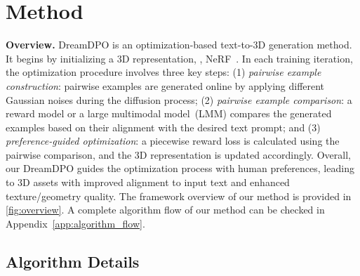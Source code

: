 \section{Method}
\label{sec:method}

\textbf{Overview.} DreamDPO is an optimization-based text-to-3D generation method. It begins by initializing a 3D representation, \eg, NeRF~\citep{mildenhall2020nerf}. In each training iteration, the optimization procedure involves three key steps: (1) \textit{pairwise example construction}: pairwise examples are generated online by applying different Gaussian noises during the diffusion process; (2) \textit{pairwise example comparison}: a reward model or a large multimodal model~(LMM) compares the generated examples based on their alignment with the desired text prompt; and (3) \textit{preference-guided optimization}: a piecewise reward loss is calculated using the pairwise comparison, and the 3D representation is updated accordingly. Overall, our DreamDPO guides the optimization process with human preferences, leading to 3D assets with improved alignment to input text and enhanced texture/geometry quality. The framework overview of our method is provided in \cref{fig:overview}. A complete algorithm flow of our method can be checked in Appendix~\ref{app:algorithm_flow}. 



\subsection{Algorithm Details}

